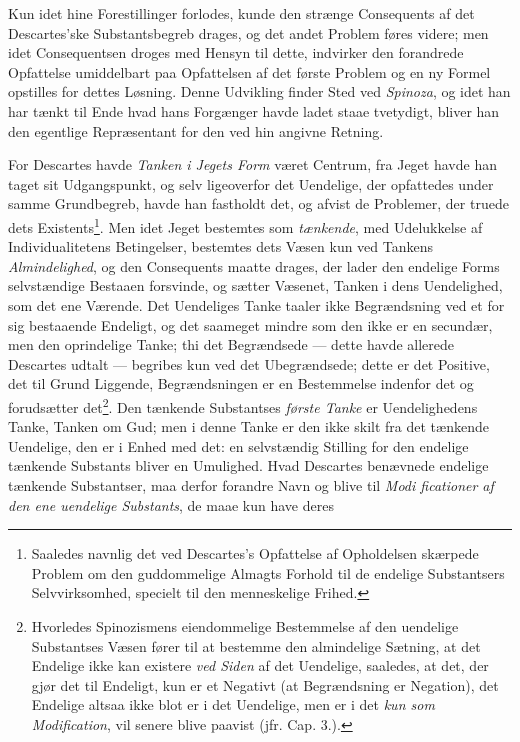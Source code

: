 \documentclass[12pt,a4paper]{book}
\newcommand{\opage}[1]{\marginnote{\footnotesize\textit{[#1]}}}
\begin{document}
Kun idet hine Forestillinger forlodes, kunde den strænge Consequents af
det Descartes'ske Substantsbegreb drages, og det andet Problem føres
videre; men idet Consequentsen droges med Hensyn til dette, indvirker den
forandrede Opfattelse umiddelbart paa Opfattelsen af det første Problem
og en ny Formel opstilles for dettes Løsning. Denne Udvikling finder Sted
ved \emph{Spinoza}, og idet han har tænkt til Ende hvad hans Forgænger
havde ladet staae tvetydigt, bliver han den egentlige Repræsentant for
den ved hin angivne Retning.
\opage{22} \setcounter{footnote}{0}%

For Descartes havde \emph{Tanken i Jegets Form} været Centrum, fra Jeget
havde han taget sit Udgangspunkt, og selv ligeoverfor det Uendelige, der
opfattedes under samme Grundbegreb, havde han fastholdt det, og afvist de
Problemer, der truede dets Existents\footnote{Saaledes navnlig det ved
Descartes's Opfattelse af Opholdelsen skærpede Problem om den
guddommelige Almagts Forhold til de endelige Substantsers
Selvvirksomhed, specielt til den menneskelige Frihed.}. Men idet Jeget
bestemtes som \emph{tænkende}, med Udelukkelse af Individualitetens
Betingelser, bestemtes dets Væsen kun ved Tankens \emph{Almindelighed},
og den Consequents maatte drages, der lader den endelige Forms
selvstændige Bestaaen forsvinde, og sætter Væsenet, Tanken i dens
Uendelighed, som det ene Værende. Det Uendeliges Tanke taaler ikke
Begrændsning ved et for sig bestaaende Endeligt, og det saameget mindre
som den ikke er en secundær, men den oprindelige Tanke; thi det
Begrændsede --- dette havde allerede Descartes udtalt --- begribes kun
ved det Ubegrændsede; dette er det Positive, det til Grund Liggende,
Begrændsningen er en Bestemmelse indenfor det og forudsætter
det\footnote{Hvorledes Spinozismens eiendommelige Bestemmelse af den
uendelige Substantses Væsen fører til at bestemme den almindelige
Sætning, at det Endelige ikke kan existere \emph{ved Siden} af det
Uendelige, saaledes, at det, der gjør det til Endeligt, kun er et
Negativt (at Begrændsning er Negation), det Endelige altsaa ikke blot er
i det Uendelige, men er i det \emph{kun som Modification}, vil senere
blive paavist (jfr. Cap. 3.).}. Den tænkende Substantses \emph{første
Tanke} er Uendelighedens Tanke, Tanken om Gud; men i denne Tanke er den
ikke skilt fra det tænkende Uendelige, den er i Enhed med det: en
selvstændig Stilling for den endelige tænkende Substants bliver en
Umulighed. Hvad Descartes benævnede endelige tænkende Substantser, maa
derfor forandre Navn og blive til \emph{Modi\-%
ficationer af den ene uendelige Substants}, de maae kun have deres
\end{document}
